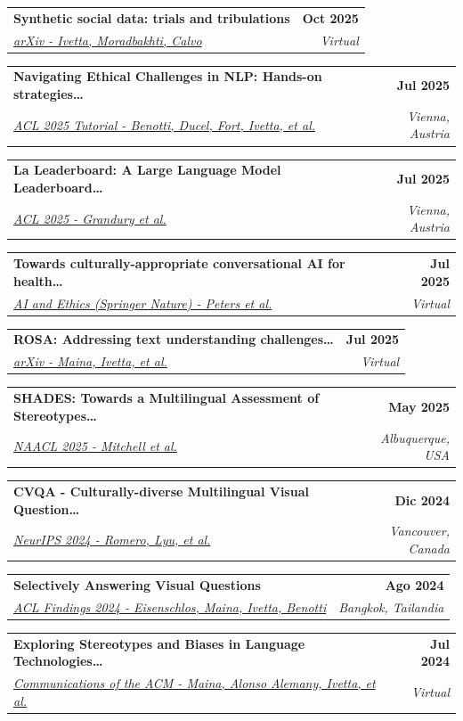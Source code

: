 \documentclass[letterpaper,11pt]{article}
\makeatletter
\newif\ifeng
\newcommand{\lang}[2]{\ifeng #1\else #2\fi}
\newcommand{\resumeSubheading}[4]{
  \vspace{-2pt}\item
    \begin{tabular*}{1.0\textwidth}[t]{l@{\extracolsep{\fill}}r}
      \textbf{\large#1} & \textbf{\small #2} \\
      \textit{\large#3} & \textit{\small #4} \\
    \end{tabular*}\vspace{-7pt}
}
\makeatother
\begin{document}
        \resumeSubheading{Synthetic social data: trials and tribulations
        \href{https://arxiv.org/abs/2510.19952}
        {\raisebox{-0.1\height}\faExternalLink } }{Oct 2025}{\underline{arXiv - Ivetta, Moradbakhti, Calvo}}{Virtual}

        \resumeSubheading{Navigating Ethical Challenges in NLP: Hands-on strategies\ldots
        \href{https://aclanthology.org/2025.acl-tutorials.5/}
        {\raisebox{-0.1\height}\faExternalLink } }{Jul 2025}{\underline{ACL 2025 Tutorial - Benotti, Ducel, Fort, Ivetta, et al.}}{Vienna, Austria}

        \resumeSubheading{La Leaderboard: A Large Language Model Leaderboard\ldots
        \href{https://aclanthology.org/2025.acl-long.1561/}
        {\raisebox{-0.1\height}\faExternalLink } }{Jul 2025}{\underline{ACL 2025 - Grandury et al.}}{Vienna, Austria}

        \resumeSubheading{Towards culturally-appropriate conversational AI for health\ldots
        \href{https://link.springer.com/article/10.1007/s43681-026-01196-y}
        {\raisebox{-0.1\height}\faExternalLink } }{Jul 2025}{\underline{AI and Ethics (Springer Nature) - Peters et al.}}{Virtual}
        
        \resumeSubheading{ROSA: Addressing text understanding challenges\ldots
        \href{https://www.arxiv.org/abs/2506.03665}
        {\raisebox{-0.1\height}\faExternalLink } }{Jul 2025}{\underline{arXiv - Maina, Ivetta, et al.}}{Virtual}

        \resumeSubheading{SHADES: Towards a Multilingual Assessment of Stereotypes\ldots
        \href{https://aclanthology.org/2025.naacl-long.600/}
        {\raisebox{-0.1\height}\faExternalLink } }{May 2025}{\underline{NAACL 2025 - Mitchell et al.}}{Albuquerque, USA}
        
        \resumeSubheading{CVQA - Culturally-diverse Multilingual Visual Question\ldots
        \href{https://cvqa-benchmark.org/}
        {\raisebox{-0.1\height}\faExternalLink } }{\lang{Dec 2024}{Dic 2024}}{\underline{NeurIPS 2024 - Romero, Lyu, et al.}}{Vancouver, Canada}
    
        \resumeSubheading{Selectively Answering Visual Questions
        \href{https://aclanthology.org/2024.findings-acl.250/}
        {\raisebox{-0.1\height}\faExternalLink } }{\lang{Aug 2024}{Ago 2024}}{\underline{ACL Findings 2024 - Eisenschlos, Maina, Ivetta, Benotti}}{\lang{Bangkok, Thailand}{Bangkok, Tailandia}}

        \resumeSubheading{Exploring Stereotypes and Biases in Language Technologies\ldots
        \href{https://dl.acm.org/doi/10.1145/3653322}
        {\raisebox{-0.1\height}\faExternalLink } }{Jul 2024}{\underline{Communications of the ACM - Maina, Alonso Alemany, Ivetta, et al.}}{Virtual}
    
\end{document}
